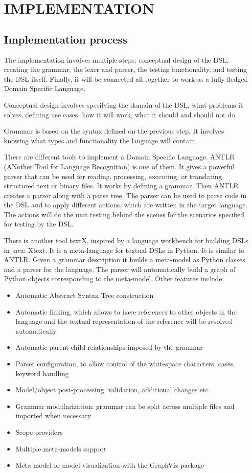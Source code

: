 \chapter{IMPLEMENTATION}

\section{Implementation process}

The implementation involves multiple steps: conceptual design of the DSL, creating the grammar, the lexer and parser, the testing functionality, and testing the DSL itself. Finally, it will be connected all together to work as a fully-fledged Domain Specific Language.

Conceptual design involves specifying the domain of the DSL, what problems it solves, defining use cases, how it will work, what it should and should not do.

Grammar is based on the syntax defined on the previous step. It involves knowing what types and functionality the language will contain.

There are different tools to implement a Domain Specific Language. ANTLR (ANother Tool for Language Recognition) is one of them. It gives a powerful parser that can be used for reading, processing, executing, or translating structured text or binary files. It works by defining a grammar. Then ANTLR creates a parser along with a parse tree. The parser can be used to parse code in the DSL and to apply different actions, which are written in the target language. The actions will do the unit testing behind the scenes for the scenarios specified for testing by the DSL.

There is another tool textX, inspired by a language workbench for building DSLs in java: Xtext. It is a meta-language for textual DSLs in Python. It is similar to ANTLR. Given a grammar description it builds a meta-model as Python classes and a parser for the language. The parser will automatically build a graph of Python objects corresponding to the meta-model. Other features include:
\begin{itemize}
    \item Automatic Abstract Syntax Tree construction
    \item Automatic linking, which allows to have references to other objects in the language and the textual representation of the reference will be resolved automatically
    \item Automatic parent-child relationships imposed by the grammar
    \item Parser configuration, to allow control of the whitespace characters, cases, keyword handling
    \item Model/object post-processing: validation, additional changes etc.
    \item Grammar modularization: grammar can be split across multiple files and imported when necessary
    \item Scope providers
    \item Multiple meta-models support
    \item Meta-model or model visualization with the GraphViz package
\end{itemize}

